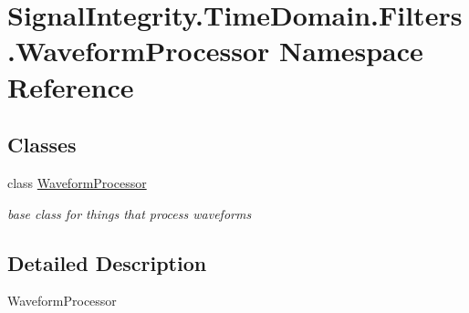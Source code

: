 \hypertarget{namespaceSignalIntegrity_1_1TimeDomain_1_1Filters_1_1WaveformProcessor}{}\section{Signal\+Integrity.\+Time\+Domain.\+Filters.\+Waveform\+Processor Namespace Reference}
\label{namespaceSignalIntegrity_1_1TimeDomain_1_1Filters_1_1WaveformProcessor}
\subsection*{Classes}
\begin{DoxyCompactItemize}
\item 
class \hyperlink{classSignalIntegrity_1_1TimeDomain_1_1Filters_1_1WaveformProcessor_1_1WaveformProcessor}{Waveform\+Processor}
\begin{DoxyCompactList}\small\item\em base class for things that process waveforms \end{DoxyCompactList}\end{DoxyCompactItemize}


\subsection{Detailed Description}
\begin{DoxyVerb}WaveformProcessor\end{DoxyVerb}
 
